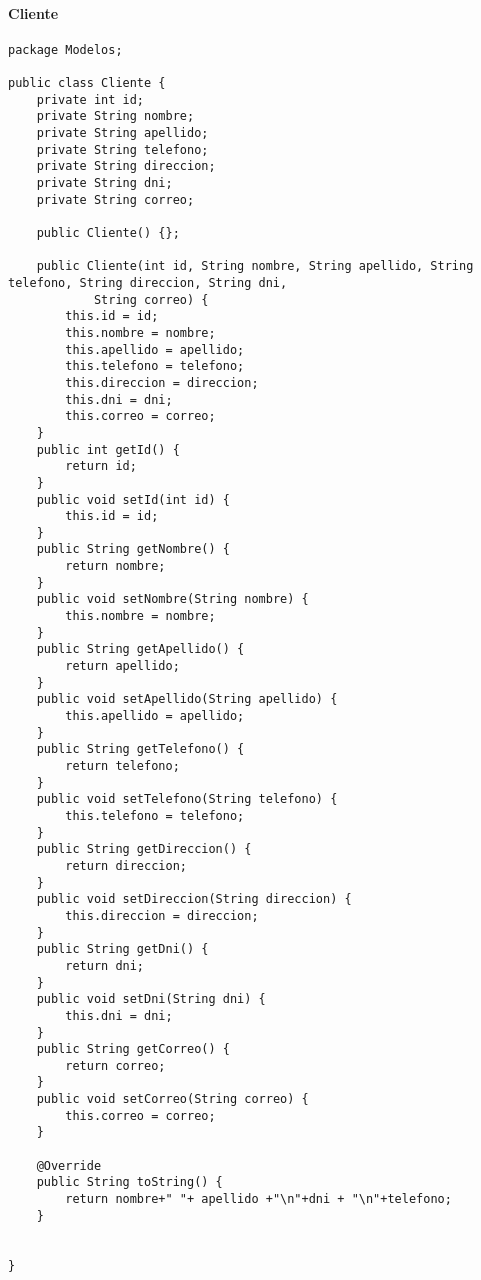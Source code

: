 \paragraph{Cliente}
\begin{lstlisting}
package Modelos;

public class Cliente {
	private int id;
	private String nombre;
	private String apellido;
	private String telefono;
	private String direccion;
	private String dni;
	private String correo;
	
	public Cliente() {};
	
	public Cliente(int id, String nombre, String apellido, String telefono, String direccion, String dni,
			String correo) {
		this.id = id;
		this.nombre = nombre;
		this.apellido = apellido;
		this.telefono = telefono;
		this.direccion = direccion;
		this.dni = dni;
		this.correo = correo;
	}
	public int getId() {
		return id;
	}
	public void setId(int id) {
		this.id = id;
	}
	public String getNombre() {
		return nombre;
	}
	public void setNombre(String nombre) {
		this.nombre = nombre;
	}
	public String getApellido() {
		return apellido;
	}
	public void setApellido(String apellido) {
		this.apellido = apellido;
	}
	public String getTelefono() {
		return telefono;
	}
	public void setTelefono(String telefono) {
		this.telefono = telefono;
	}
	public String getDireccion() {
		return direccion;
	}
	public void setDireccion(String direccion) {
		this.direccion = direccion;
	}
	public String getDni() {
		return dni;
	}
	public void setDni(String dni) {
		this.dni = dni;
	}
	public String getCorreo() {
		return correo;
	}
	public void setCorreo(String correo) {
		this.correo = correo;
	}
	
	@Override
	public String toString() {
		return nombre+" "+ apellido +"\n"+dni + "\n"+telefono;
	}
	
	
}
\end{lstlisting}
\clearpage

